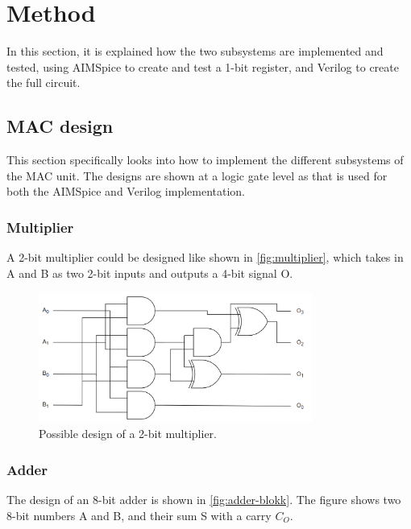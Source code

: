 \section{Method}
\label{sec:method}

In this section, it is explained how the two subsystems are implemented and tested, using AIMSpice to create and test a 1-bit register, and Verilog to create the full circuit. 

\subsection{MAC design}
\label{subsec:circuitDesign}

This section specifically looks into how to implement the different subsystems of the MAC unit. The designs are shown at a logic gate level as that is used for both the AIMSpice and Verilog implementation. 

\subsubsection{Multiplier} 

A 2-bit multiplier could be designed like shown in \autoref{fig:multiplier}, which takes in A and B as two 2-bit inputs and outputs a 4-bit signal O. 

\begin{figure}[H]
    \centering
    \includegraphics[width=0.8\textwidth]{Figures/multiplier.png}
    \caption{Possible design of a 2-bit multiplier.}
    \label{fig:multiplier}
\end{figure}

\subsubsection{Adder}

The design of an 8-bit adder is shown in \autoref{fig:adder-blokk}. The figure shows two 8-bit numbers A and B, and their sum S with a carry $C_O$. 

